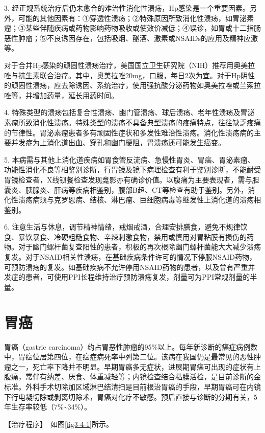 3.
经正规系统治疗后仍未愈合的难治性消化性溃疡，Hp感染是一个重要因素。另外，可能的其他因素有：①穿透性溃疡；②特殊原因所致消化性溃疡，如胃泌素瘤；③某些伴随疾病或药物影响药物吸收或使效价减低；④误诊，如胃或十二指肠恶性肿瘤；⑤不良诱因存在，包括吸烟、酗酒、激素或NSAIDs的应用及精神应激等。

对于合并Hp感染的顽固性溃疡治疗，美国国立卫生研究院（NIH）推荐用奥美拉唑与抗生素联合治疗。其中，奥美拉唑20mg，口服，每日2次为宜。对于Hp阴性的顽固性溃疡，应去除诱因、系统治疗，使用强抗酸分泌药物如奥美拉唑或兰索拉唑等，并增加药量，延长用药时间。

4.
特殊类型的溃疡包括复合性溃疡、幽门管溃疡、球后溃疡、老年性溃疡及胃泌素瘤所致消化性溃疡。特殊类型的溃疡不具备典型溃疡的疼痛特点，往往缺乏疼痛的节律性。胃泌素瘤患者多有顽固性症状和多发性难治性溃疡。消化性溃疡病的主要并发症为上消化道出血、穿孔和幽门梗阻，胃溃疡还可能发生癌变。

5.
本病需与其他上消化道疾病如胃食管反流病、急慢性胃炎、胃癌、胃泌素瘤、功能性消化不良等相鉴别诊断，行胃镜及镜下病理检查有利于鉴别诊断，不能耐受胃镜检查者，X线钡餐检查发现龛影亦有确诊价值。以腹痛为主要表现者，需与胆囊炎、胰腺炎、肝病等疾病相鉴别，腹部B超、CT等检查有助于鉴别。另外，消化性溃疡病须与克罗恩病、结核、淋巴瘤、巨细胞病毒等继发性上消化道的溃疡相鉴别。

6.
注意生活与休息，调节精神情绪，戒烟戒酒，合理安排膳食，避免不规律饮食、暴饮暴食、冷硬粗糙食物、辛辣刺激食物，禁用或慎用对胃粘膜有损伤的药物。对于幽门螺杆菌复查阳性的患者，积极的再次根除幽门螺杆菌能大大减少溃疡复发。对于NSAID相关性溃疡，在基础疾病条件许可的情况下停服NSAID药物，可预防溃疡的复发。如基础疾病不允许停用NSAID药物的患者，以及曾有严重并发症的患者，可使用PPI长程维持治疗预防溃疡复发，剂量可为PPI常规剂量的半量。

\section{胃癌}

胃癌（gastric
carcinoma）约占胃恶性肿瘤的95\%以上。每年新诊断的癌症病例数中，胃癌位居第四位，在癌症病死率中列第二位。该病在我国仍是最常见的恶性肿瘤之一，死亡率下降并不明显。早期胃癌多无症状，进展期胃癌可出现的症状有上腹痛，常伴有纳差、厌食、体重减轻等；内镜检查结合粘膜活检，是目前诊断的金标准。外科手术切除加区域淋巴结清扫是目前根治胃癌的手段，早期胃癌可在内镜下行电凝切除或剥离切除术，胃癌对化疗不敏感。预后直接与诊断的分期有关，5年生存率较低（7\%\textasciitilde{}34\%）。

【治疗程序】　如图\ref{fig3-4-1}所示。

